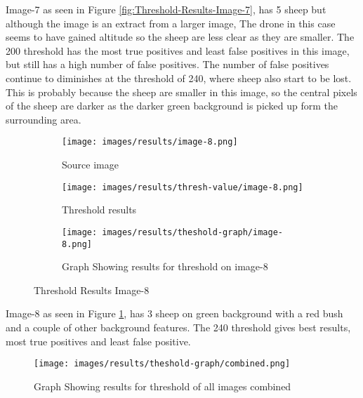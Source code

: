 Image-7 as seen in Figure \ref{fig:Threshold-Results-Image-7}, has 5 sheep but although the image is an extract from a larger image, The drone in this case seems to have gained altitude so the sheep are less clear as they are smaller. The 200 threshold has the most true positives and least false positives in this image, but still has a high number of false positives. The number of false positives continue to diminishes at the threshold of 240, where sheep also start to be lost. This is probably because the sheep are smaller in this image, so the central pixels of the sheep are darker as the darker green background is picked up form the surrounding area.

\begin{figure}[H]
    \centering

\begin{subfigure}{.5\textwidth}
    \centering
    \texttt{[image: images/results/image-8.png]}
    \caption{Source image}

\end{subfigure}%
\begin{subfigure}{.5\textwidth}
\centering
    \texttt{[image: images/results/thresh-value/image-8.png]}
    \caption{Threshold results}

\end{subfigure}
\begin{subfigure}{.9\textwidth}
\centering
    \texttt{[image: images/results/theshold-graph/image-8.png]}
    \caption{Graph Showing results for threshold on image-8}
\end{subfigure}%

    \caption{Threshold Results Image-8}
    \label{fig:Threshold-Results-Image-8}
\end{figure}

Image-8 as seen in Figure \ref{fig:Threshold-Results-Image-8}, has 3 sheep on green background with a red bush and a couple of other background features. The 240 threshold gives best results, most true positives and least false positive.


\begin{figure}[H]
    \centering

    \texttt{[image: images/results/theshold-graph/combined.png]}
    \caption{Graph Showing results for threshold of all images combined}
    \label{fig:Threshold-Results-combined}
\end{figure}

